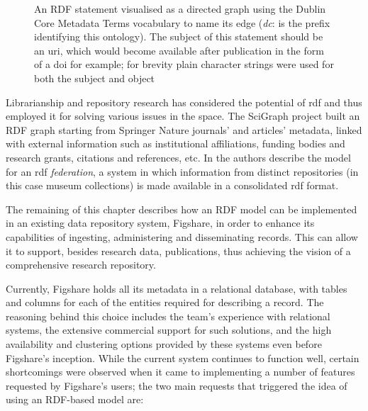 \begin{figure}[thpb]
  \centering
  \caption{An RDF statement visualised as a directed graph using the Dublin Core Metadata Terms vocabulary to name its edge (\emph{dc}: is the prefix identifying this ontology). The subject of this statement should be an \gls{uri}, which would become available after publication in the form of a \gls{doi} for example; for brevity plain character strings were used for both the subject and object}
  \label{fig:graphinit}
\end{figure}

Librarianship and repository research has considered the potential of \gls{rdf} and thus employed it for solving various issues in the space. The SciGraph project \cite{scigraph} built an RDF graph starting from Springer Nature journals' and articles' metadata, linked with external information such as institutional affiliations, funding bodies and research grants, citations and references, etc.  In \cite{ichim} the authors describe the model for an \gls{rdf} \emph{federation}, a system in which information from distinct repositories (in this case museum collections) is made available in a consolidated \gls{rdf} format.

The remaining of this chapter describes how an RDF model can be implemented in an existing data repository system, Figshare, in order to enhance its capabilities of ingesting, administering and disseminating records. This can allow it to support, besides research data, publications, thus achieving the vision of a comprehensive research repository. 

Currently, Figshare holds all its metadata in a relational database, with tables and columns for each of the entities required for describing a record. The reasoning behind this choice includes the team's experience with relational systems, the extensive commercial support for such solutions, and the high availability and clustering options provided by these systems even before Figshare's inception. While the current system continues to function well, certain shortcomings were observed when it came to implementing a number of features requested by Figshare's users; the two main requests that triggered the idea of using an RDF-based model are:

